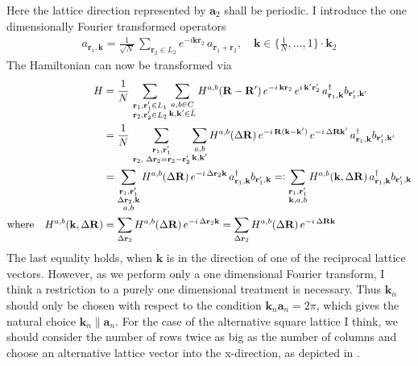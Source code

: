 Here the lattice direction represented by $\mathbf{a}_2$ shall be periodic. I introduce the one dimensionally Fourier transformed operators
\begin{align*}
    a_{\mathbf{r}_1,\mathbf{k}} = \frac{1}{\sqrt{N}}\,\sum_{\mathbf{r}_2\in L_2} e^{-i\mathbf{k}\mathbf{r}_2}\,a_{\mathbf{r}_1+\mathbf{r}_2},\quad\mathbf{k}\in \{\frac{1}{N},\dots,1\}\cdot\mathbf{k}_2
\end{align*}
The Hamiltonian can now be transformed via
\begin{align*}
    H &=\frac{1}{N}\,  \sum_{\substack{\mathbf{r}_1,\mathbf{r}_1'\in L_1\\\mathbf{r}_2,\mathbf{r}_2'\in L_2}}\sum_{\substack{a,b \in C\\\mathbf{k},\mathbf{k}'\in\bar{L}}}H^{a,b}(\mathbf{R}-\mathbf{R}')\,e^{-i\,\mathbf{k}\mathbf{r}_2}\,e^{i\,\mathbf{k}'\mathbf{r}_2'}\,a_{\mathbf{r}_1,\mathbf{k}}^{\dagger} b_{\mathbf{r}_1',\mathbf{k}'}\\
    &=  \frac{1}{N}\,\sum_{\substack{\mathbf{r}_1,\mathbf{r}_1'\\\mathbf{r}_2,\;\Delta\mathbf{r}_2=\mathbf{r}_2-\mathbf{r}_2'}}\sum_{\substack{a,b 
    \\\mathbf{k},\mathbf{k}'}}H^{a,b}(\Delta\mathbf{R})\,e^{-i\,\mathbf{R}(\mathbf{k}-\mathbf{k}')}\,e^{-i\,\Delta\mathbf{R}\mathbf{k}'}\,a_{\mathbf{r}_1,\mathbf{k}}^{\dagger} b_{\mathbf{r}_1',\mathbf{k}'}\\
    &=\sum_{\substack{\mathbf{r}_1,\mathbf{r}_1'\\\Delta\mathbf{r}_2,\mathbf{k}\\a,b}}H^{a,b}(\Delta\mathbf{R})\,e^{-i\,\Delta\mathbf{r}_2\mathbf{k}}\,a_{\mathbf{r}_1,\mathbf{k}}^{\dagger} b_{\mathbf{r}_1',\mathbf{k}}=\vcentcolon \sum_{\substack{\mathbf{r}_1,\mathbf{r}_1'\\\mathbf{k},a,b}}H^{a,b}(\mathbf{k},\Delta\mathbf{R})\,a_{\mathbf{r}_1,\mathbf{k}}^{\dagger} b_{\mathbf{r}_1',\mathbf{k}}\\
    \text{where}\quad H^{a,b}(\mathbf{k},\Delta\mathbf{R}) &= \sum_{\Delta\mathbf{r}_2}H^{a,b}(\Delta\mathbf{R})\,e^{-i\,\Delta\mathbf{r}_2\mathbf{k}}= \sum_{\Delta\mathbf{r}_2}H^{a,b}(\Delta\mathbf{R})\,e^{-i\,\Delta\mathbf{R}\mathbf{k}}
\end{align*}
The last equality holds, when $\mathbf{k}$ is in the direction of one of the reciprocal lattice vectors. However, as we perform only a one dimensional Fourier transform, I think a restriction to a purely one dimensional treatment is necessary. Thus $\mathbf{k}_n$ should only be chosen with respect to the condition $\mathbf{k}_n\mathbf{a}_n=2\pi$, which gives the natural choice $\mathbf{k}_n\mathbin{\|}\mathbf{a}_n$. For the case of the alternative square lattice I think, we should consider the number of rows twice as big as the number of columns and choose an alternative lattice vector into the x-direction, as depicted in . 

